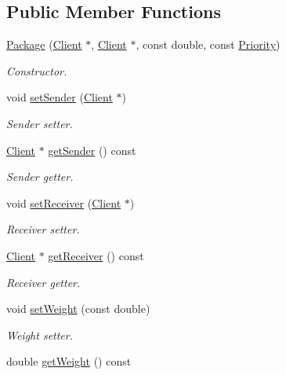\subsection*{Public Member Functions}
\begin{DoxyCompactItemize}
\item 
\hyperlink{classPackage_a64d987fe7cb1d583f2af4a38e544a6f2}{Package} (\hyperlink{classClient}{Client} $\ast$, \hyperlink{classClient}{Client} $\ast$, const double, const \hyperlink{classPackage_ac96ebcf78f2d93898635a1275da0c0bd}{Priority})
\begin{DoxyCompactList}\small\item\em Constructor. \end{DoxyCompactList}\item 
void \hyperlink{classPackage_a933801e98e91c1d540f9a47926bfc314}{set\+Sender} (\hyperlink{classClient}{Client} $\ast$)
\begin{DoxyCompactList}\small\item\em Sender setter. \end{DoxyCompactList}\item 
\hyperlink{classClient}{Client} $\ast$ \hyperlink{classPackage_a1e603126edbbd5c82c676eb0e6805554}{get\+Sender} () const 
\begin{DoxyCompactList}\small\item\em Sender getter. \end{DoxyCompactList}\item 
void \hyperlink{classPackage_a6a16574423734d7fd0aa4d5a74b0ad32}{set\+Receiver} (\hyperlink{classClient}{Client} $\ast$)
\begin{DoxyCompactList}\small\item\em Receiver setter. \end{DoxyCompactList}\item 
\hyperlink{classClient}{Client} $\ast$ \hyperlink{classPackage_a02e9aee9f9e10b6b6ba124df61bd289d}{get\+Receiver} () const 
\begin{DoxyCompactList}\small\item\em Receiver getter. \end{DoxyCompactList}\item 
void \hyperlink{classPackage_a0766f8a791e0b76d97671cb92d785496}{set\+Weight} (const double)
\begin{DoxyCompactList}\small\item\em Weight setter. \end{DoxyCompactList}\item 
double \hyperlink{classPackage_a2da083a8cab4c978c22c49ac46226aee}{get\+Weight} () const 

\end{DoxyCompactItemize}
